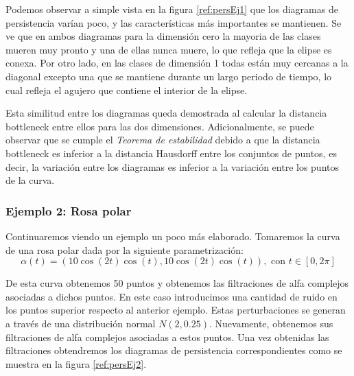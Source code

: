 Podemos observar a simple vista en la figura \ref{ref:persEj1} que los diagramas de persistencia varían poco, y las características más importantes se mantienen. Se ve que en ambos diagramas para la dimensión cero la mayoria de las clases mueren muy pronto y una de ellas nunca muere, lo que refleja que la elipse es conexa. Por otro lado, en las clases de dimensión 1 todas están muy cercanas a la diagonal excepto una que se mantiene durante un largo periodo de tiempo, lo cual refleja el agujero que contiene el interior de la elipse.

Esta similitud entre los diagramas queda demostrada al calcular la distancia bottleneck entre ellos para las dos dimensiones. Adicionalmente, se puede observar que se cumple el \emph{Teorema de estabilidad} debido a que la distancia bottleneck es inferior a la distancia Hausdorff entre los conjuntos de puntos, es decir, la variación entre los diagramas es inferior a la variación entre los puntos de la curva.

\subsubsection{Ejemplo 2: Rosa polar}
Continuaremos viendo un ejemplo un poco más elaborado. Tomaremos la curva de una rosa polar dada por la siguiente parametrización:
\[
\alpha(t)= (10\cos(2t)\cos(t), 10\cos(2t)\cos(t)), \text{ con } t\in [0,2\pi]
\]

De esta curva obtenemos 50 puntos y obtenemos las filtraciones de alfa complejos asociadas a dichos puntos. En este caso introducimos una cantidad de ruido en los puntos superior respecto al anterior ejemplo. Estas perturbaciones se generan a través de una distribución normal $N(2, 0.25)$. Nuevamente, obtenemos sus filtraciones de alfa complejos asociadas a estos puntos. Una vez obtenidas las filtraciones obtendremos los diagramas de persistencia correspondientes como se muestra en la figura \ref{ref:persEj2}.

